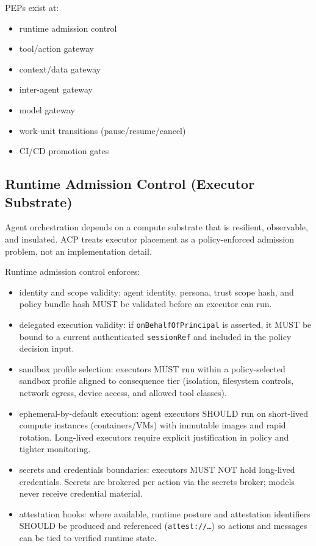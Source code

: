 \documentclass[11pt]{article}
\begin{document}
PEPs exist at:

\begin{itemize}
\tightlist
\item
  runtime admission control
\item
  tool/action gateway
\item
  context/data gateway
\item
  inter-agent gateway
\item
  model gateway
\item
  work-unit transitions (pause/resume/cancel)
\item
  CI/CD promotion gates
\end{itemize}

\hypertarget{runtime-admission-control-executor-substrate}{%
\subsection{Runtime Admission Control (Executor Substrate)}\label{runtime-admission-control-executor-substrate}}

Agent orchestration depends on a compute substrate that is resilient,
observable, and insulated. ACP treats executor placement as a
policy-enforced admission problem, not an implementation detail.

Runtime admission control enforces:

\begin{itemize}
\tightlist
\item
  identity and scope validity: agent identity, persona, trust scope
  hash, and policy bundle hash MUST be validated before an executor can
  run.
\item
  delegated execution validity: if \texttt{onBehalfOfPrincipal} is
  asserted, it MUST be bound to a current authenticated
  \texttt{sessionRef} and included in the policy decision input.
\item
  sandbox profile selection: executors MUST run within a policy-selected
  sandbox profile aligned to consequence tier (isolation, filesystem
  controls, network egress, device access, and allowed tool classes).
\item
  ephemeral-by-default execution: agent executors SHOULD run on
  short-lived compute instances (containers/VMs) with immutable images
  and rapid rotation. Long-lived executors require explicit
  justification in policy and tighter monitoring.
\item
  secrets and credentials boundaries: executors MUST NOT hold long-lived
  credentials. Secrets are brokered per action via the secrets broker;
  models never receive credential material.
\item
  attestation hooks: where available, runtime posture and attestation
  identifiers SHOULD be produced and referenced (\texttt{attest://\ldots{}}) so
  actions and messages can be tied to verified runtime state.
\end{itemize}
\end{document}
